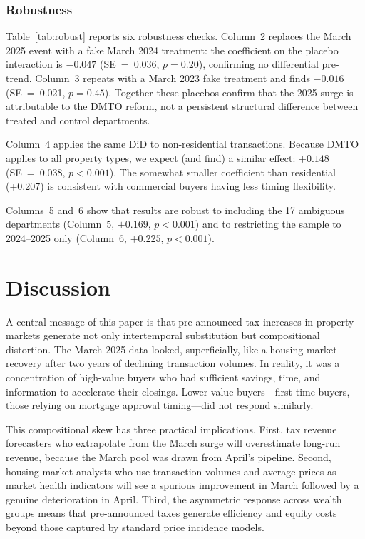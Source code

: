 \documentclass[12pt]{article}
\begin{document}


\subsubsection*{Robustness}
Table~\ref{tab:robust} reports six robustness checks. Column~2 replaces the March 2025 event
with a fake March 2024 treatment: the coefficient on the placebo interaction is $-0.047$
(SE~=~0.036, $p = 0.20$), confirming no differential pre-trend. Column~3 repeats with a
March 2023 fake treatment and finds $-0.016$ (SE~=~0.021, $p = 0.45$). Together these
placebos confirm that the 2025 surge is attributable to the DMTO reform, not a persistent
structural difference between treated and control departments.

Column~4 applies the same DiD to non-residential transactions. Because DMTO applies to all
property types, we expect (and find) a similar effect: $+0.148$ (SE~=~0.038, $p < 0.001$).
The somewhat smaller coefficient than residential (+0.207) is consistent with commercial
buyers having less timing flexibility.

Columns~5 and~6 show that results are robust to including the 17 ambiguous departments
(Column~5, $+0.169$, $p < 0.001$) and to restricting the sample to 2024--2025 only
(Column~6, $+0.225$, $p < 0.001$).



\section{Discussion}

A central message of this paper is that pre-announced tax increases in property markets
generate not only intertemporal substitution but compositional distortion. The March 2025
data looked, superficially, like a housing market recovery after two years of declining
transaction volumes. In reality, it was a concentration of high-value buyers who had sufficient
savings, time, and information to accelerate their closings. Lower-value buyers—first-time
buyers, those relying on mortgage approval timing—did not respond similarly.

This compositional skew has three practical implications. First, tax revenue
forecasters who extrapolate from the March surge will overestimate long-run revenue, because
the March pool was drawn from April's pipeline. Second, housing market analysts who use
transaction volumes and average prices as market health indicators will see a spurious improvement
in March followed by a genuine deterioration in April. Third, the asymmetric response across
wealth groups means that pre-announced taxes generate efficiency and equity costs beyond those
captured by standard price incidence models.
\end{document}
